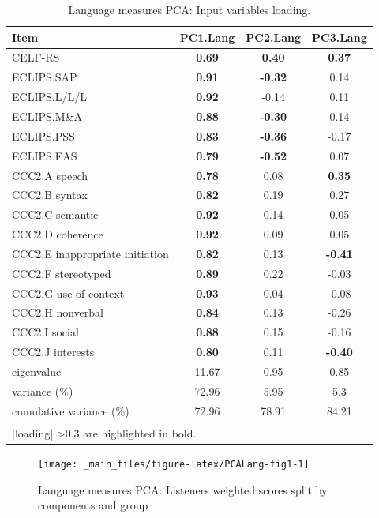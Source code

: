 \documentclass[a4paper, twoside]{templates/ociamthesis}
\begin{document}
\begin{table}

\caption{\label{tab:PCALang-Tab}Language measures PCA: Input variables loading.}
\centering
\begin{tabular}[t]{lccc}
\toprule
Item & PC1.Lang & PC2.Lang & PC3.Lang\\
\midrule
CELF-RS & \textbf{0.69} & \textbf{0.40} & \textbf{0.37}\\
ECLIPS.SAP & \textbf{0.91} & \textbf{-0.32} & 0.14\\
ECLIPS.L/L/L & \textbf{0.92} & -0.14 & 0.11\\
ECLIPS.M\&A & \textbf{0.88} & \textbf{-0.30} & 0.14\\
ECLIPS.PSS & \textbf{0.83} & \textbf{-0.36} & -0.17\\
ECLIPS.EAS & \textbf{0.79} & \textbf{-0.52} & 0.07\\
CCC2.A speech & \textbf{0.78} & 0.08 & \textbf{0.35}\\
CCC2.B syntax & \textbf{0.82} & 0.19 & 0.27\\
CCC2.C semantic & \textbf{0.92} & 0.14 & 0.05\\
CCC2.D coherence & \textbf{0.92} & 0.09 & 0.05\\
CCC2.E inappropriate initiation & \textbf{0.82} & 0.13 & \textbf{-0.41}\\
CCC2.F stereotyped & \textbf{0.89} & 0.22 & -0.03\\
CCC2.G use of context & \textbf{0.93} & 0.04 & -0.08\\
CCC2.H nonverbal & \textbf{0.84} & 0.13 & -0.26\\
CCC2.I social & \textbf{0.88} & 0.15 & -0.16\\
CCC2.J interests & \textbf{0.80} & 0.11 & \textbf{-0.40}\\
\midrule
eigenvalue & 11.67 & 0.95 & 0.85\\
variance (\%) & 72.96 & 5.95 & 5.3\\
cumulative variance (\%) & 72.96 & 78.91 & 84.21\\
\bottomrule
\multicolumn{4}{l}{\textsuperscript{} |loading| >0.3 are highlighted in bold.}\\
\end{tabular}
\end{table}

\begin{figure}

{\centering \texttt{[image: \_main\_files/figure-latex/PCALang-fig1-1]} 

}

\caption{Language measures PCA: Listeners weighted scores split by components and group}\label{fig:PCALang-fig1}
\end{figure}
\end{document}
